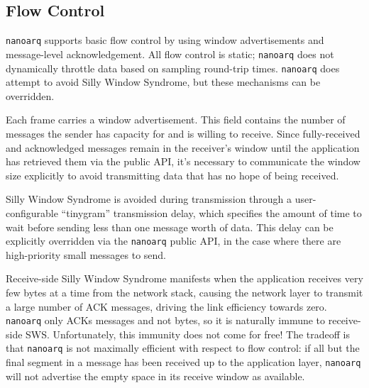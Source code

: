 \documentclass[11pt]{article}
\newcommand{\nanoarq}{\texttt{nanoarq}}
\begin{document}
\subsection{Flow Control}
\nanoarq{} supports basic flow control by using window advertisements and message-level acknowledgement. All flow control is static; \nanoarq{} does not dynamically throttle data based on sampling round-trip times. \nanoarq{} does attempt to avoid Silly Window Syndrome, but these mechanisms can be overridden. \par

Each frame carries a window advertisement. This field contains the number of messages the sender has capacity for and is willing to receive. Since fully-received and acknowledged messages remain in the receiver's window until the application has retrieved them via the public API, it's necessary to communicate the window size explicitly to avoid transmitting data that has no hope of being received. \par

Silly Window Syndrome  is avoided during transmission through a user-configurable \enquote{tinygram} transmission delay, which specifies the amount of time to wait before sending less than one message worth of data. This delay can be explicitly overridden via the \nanoarq{} public API, in the case where there are high-priority small messages to send. \par

Receive-side Silly Window Syndrome manifests when the application receives very few bytes at a time from the network stack, causing the network layer to transmit a large number of ACK messages, driving the link efficiency towards zero. \nanoarq{} only ACKs messages and not bytes, so it is naturally immune to receive-side SWS. Unfortunately, this immunity does not come for free! The tradeoff is that \nanoarq{} is not maximally efficient with respect to flow control: if all but the final segment in a message has been received up to the application layer, \nanoarq{} will not advertise the empty space in its receive window as available. \par
\end{document}
